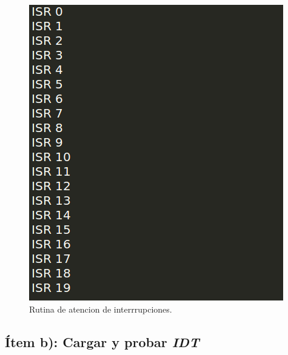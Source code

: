   \begin{figure}[H]
\begin{center}
  \includegraphics[width=\linewidth]{ejercicio2/israsm.png}
  \caption{{\small Rutina de atencion de interrrupciones.} }
\endminipage
\end{center}
\end{figure}


\subsection{Ítem b): Cargar y probar \textit{IDT}}